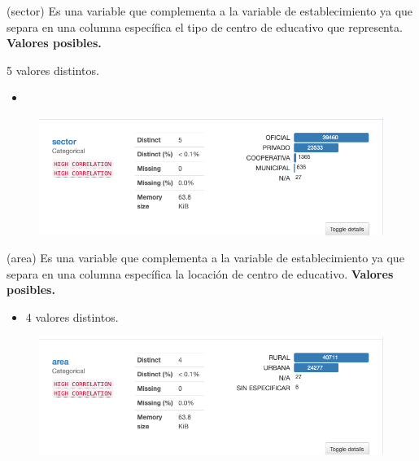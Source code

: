 
\begin{variable}(sector) 
Es una variable que complementa a la variable de establecimiento ya que separa en una columna específica el tipo de centro de educativo que representa.
\bigbreak 
\textbf{Valores posibles.}
\item 5 valores distintos. 
\begin{itemize}
	\item 
\end{itemize}
\begin{figure}[H]
	\centering
	\includegraphics[scale=0.5]{Images/9}
\end{figure}
\end{variable}


\begin{variable}(area) 
Es una variable que complementa a la variable de establecimiento ya que separa en una columna específica la locación de centro de educativo.
\bigbreak 
\textbf{Valores posibles.}
\begin{itemize}
	\item 4 valores distintos. 
\end{itemize}
\begin{figure}[H]
	\centering
	\includegraphics[scale=0.5]{Images/10}
\end{figure}
\end{variable}



